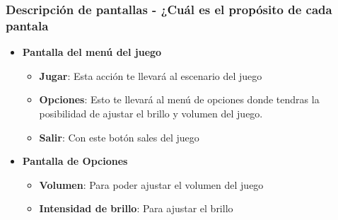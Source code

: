 \subsubsection{Descripción de pantallas - ¿Cuál es el propósito de cada pantala}
\begin{itemize}
  \item \textbf{Pantalla del menú del juego}
    \begin{itemize}
      \item \textbf{Jugar}: Esta acción te llevará al escenario del juego
      \item \textbf{Opciones}: Esto te llevará al menú de opciones donde tendras
        la posibilidad de ajustar el brillo y volumen del juego.
      \item \textbf{Salir}: Con este botón sales del juego
    \end{itemize}
  \item \textbf{Pantalla de Opciones}
    \begin{itemize}
      \item \textbf{Volumen}: Para poder ajustar el volumen del juego
      \item \textbf{Intensidad de brillo}: Para ajustar el brillo
    \end{itemize}
\end{itemize}


